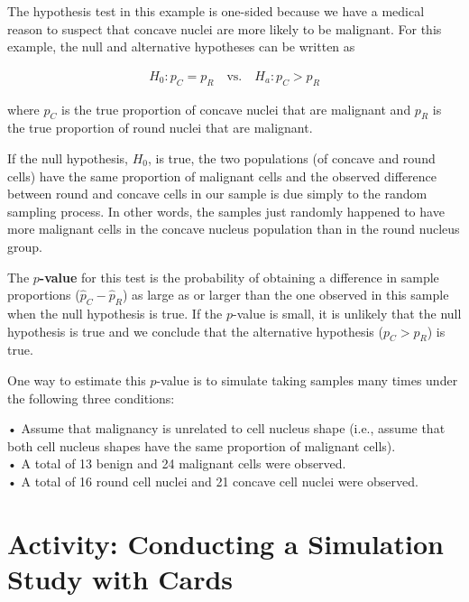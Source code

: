 \documentclass[
]{report}
\begin{document}
The hypothesis test in this example is one-sided because we have a medical reason to suspect that concave nuclei are more likely to be malignant. For this example, the null and alternative hypotheses can be written as

\begin{align}\label{5.1}
H_0: p_C = p_R \quad\text{vs.}\quad H_a: p_C > p_R 
\tag{5.1}
\end{align}

where \(p_C\) is the true proportion of concave nuclei that are malignant and \(p_R\) is the true proportion of round nuclei that are malignant.

If the null hypothesis, \(H_0\), is true, the two populations (of concave and round cells) have the same proportion of malignant cells and the observed difference between round and concave cells in our sample is due simply to the random sampling process. In other words, the samples just randomly happened to have more malignant cells in the concave nucleus population than in the round nucleus group.

The \textbf{\(p\)-value} for this test is the probability of obtaining a difference in sample proportions (\(\hat p_C - \hat p_R\)) as large as or larger than the one observed in this sample when the null hypothesis is true. If the \(p\)-value is small, it is unlikely that the null hypothesis is true and we conclude that the alternative hypothesis (\(p_C > p_R\)) is true.

One way to estimate this \(p\)-value is to simulate taking samples many times under the following three conditions:

• Assume that malignancy is unrelated to cell nucleus shape (i.e., assume that both cell nucleus shapes have the same proportion of malignant cells).\\
• A total of 13 benign and 24 malignant cells were observed.\\
• A total of 16 round cell nuclei and 21 concave cell nuclei were observed.

\hypertarget{activity-conducting-a-simulation-study-with-cards}{%
\section*{Activity: Conducting a Simulation Study with Cards}\label{activity-conducting-a-simulation-study-with-cards}}
\end{document}

